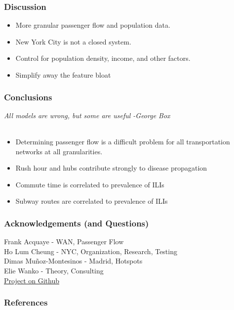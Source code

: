 \documentclass{beamer}
\begin{document}
\begin{frame}
\frametitle{Discussion}
\begin{itemize}
    \item More granular passenger flow and population data.
    \item New York City is not a closed system.
    \item Control for population density, income, and other factors.
    \item Simplify away the feature bloat
\end{itemize}
\end{frame}
\begin{frame}
\frametitle{Conclusions}
\textit{All models are wrong, but some are useful -George Box}\\~\\
\begin{itemize}
    \item Determining passenger flow is a difficult problem for all transportation networks at all granularities.
    \item Rush hour and hubs contribute strongly to disease propagation
    \item Commute time is correlated to prevalence of ILIs
    \item Subway routes are correlated to prevalence of ILIs
\end{itemize}
\end{frame}
\begin{frame}
\frametitle{Acknowledgements (and Questions)}
Frank Acquaye - WAN, Passenger Flow\\
Ho Lum Cheung - NYC, Organization, Research, Testing\\
Dimas Muñoz-Montesinos - Madrid, Hotspots\\
Elie Wanko - Theory, Consulting\\
\href{https://github.com/cheung-ho-lum/NS_Epidemics_ABM_Approach}{Project on Github}
\end{frame}
\begin{frame}[shrink=50]
\frametitle{References}


\end{frame}
\end{document}
